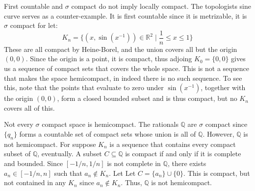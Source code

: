 \documentclass{article}                                                        %
\begin{document}
        \begin{example}
            First countable and $\sigma$ compact do not imply locally compact.
            The topologists sine curve serves as a counter-example. It is
            first countable since it is metrizable, it is $\sigma$ compact for
            let:
            \begin{equation}
                K_{n}=\{(x,\sin(x^{\minus{1}}))\in\mathbb{R}^{2}\;|\;
                    \frac{1}{n}\leq{x}\leq{1}\}
            \end{equation}
            These are all compact by Heine-Borel, and the union covers all but
            the origin $(0,0)$. Since the origin is a point, it is compact,
            thus adjoing $K_{0}=\{0,0\}$ gives us a sequence of compact sets
            that covers the whole space. This is not a sequence that makes
            the space hemicompact, in indeed there is no such sequence. To see
            this, note that the points that evaluate to zero under
            $\sin(x^{\minus{1}})$, together with the origin $(0,0)$, form a
            closed bounded subset and is thus compact, but no $K_{n}$ covers all
            of this.
        \end{example}
        \begin{example}
            Not every $\sigma$ compact space is hemicompact. The rationals
            $\mathbb{Q}$ are $\sigma$ compact since $\{q_{n}\}$ forms a
            countable set of compact sets whose union is all of $\mathbb{Q}$.
            However, $\mathbb{Q}$ is not hemicompact. For suppose
            $K_{n}$ is a sequence that contains every compact subset of
            $\mathbb{Q}$, eventually. A subset $C\subseteq\mathbb{Q}$ is compact
            if and only if it is complete and bounded. Since
            $[\minus{1}/n,1/n]$ is not complete in $\mathbb{Q}$, there exists
            $a_{n}\in[\minus{1}/n,n]$ such that $a_{n}\notin{K}_{n}$. Let
            Let $C=\{a_{n}\}\cup\{0\}$. This is compact, but not contained in
            any $K_{n}$ since $a_{n}\notin{K}_{n}$. Thus, $\mathbb{Q}$ is not
            hemicompact.
        \end{example}
\end{document}
